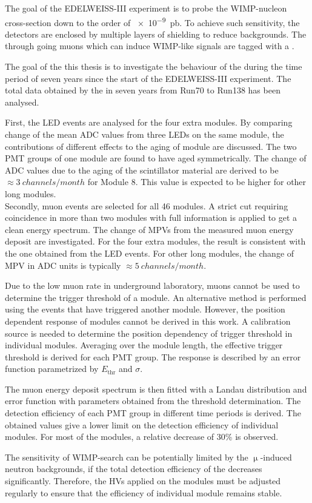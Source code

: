 The goal of the EDELWEISS-III experiment is to probe the WIMP-nucleon cross-section down to the order of \SI{e-9}{pb}. To achieve such sensitivity, the detectors are enclosed by multiple layers of shielding to reduce backgrounds. The through going muons which can induce WIMP-like signals are tagged with a \mvs{}.

The goal of the this thesis is to investigate the behaviour of the \mvs{} during the time period of seven years since the start of the EDELWEISS-III experiment. The total data obtained by the \mvs{} in seven years from Run70 to Run138 has been analysed.

First, the LED events are analysed for the four extra modules. By comparing change of the mean ADC values from three LEDs on the same module, the contributions of different effects to the aging of module are discussed. The two PMT groups of one module are found to have aged symmetrically. The change of ADC values due to the aging of the scintillator material are derived to be $\approx \SI{3}{channels\per month}$ for Module 8. This value is expected to be higher for other long modules.\\
Secondly, muon events are selected for all 46 modules. A strict cut requiring coincidence in more than two modules with full information is applied to get a clean energy spectrum. The change of MPVs from the measured muon energy deposit are investigated. For the four extra modules, the result is consistent with the one obtained from the LED events. For other long modules, the change of MPV in ADC units is typically $\approx \SI{5}{channels\per month}$.

Due to the low muon rate in underground laboratory, muons cannot be used to determine the trigger threshold of a module. An alternative method is performed using the events that have triggered another module.
However, the position dependent response of modules cannot be derived in this work. A calibration source is needed to determine the position dependency of trigger threshold in individual modules.
Averaging over the module length, the effective trigger threshold is derived for each PMT group. The response is described by an error function parametrized by $E_{\mathrm{thr}}$ and $\sigma$.

The muon energy deposit spectrum is then fitted with a Landau distribution and error function with parameters obtained from the threshold determination. The detection efficiency of each PMT group in different time periods is derived. The obtained values give a lower limit on the detection efficiency of individual modules. For most of the modules, a relative decrease of 30\% is observed.

The sensitivity of WIMP-search can be potentially limited by the $\upmu{}$-induced neutron backgrounds, if the total detection efficiency of the \mvs{} decreases significantly. Therefore, the HVs applied on the modules must be adjusted regularly to ensure that the efficiency of individual module remains stable.
